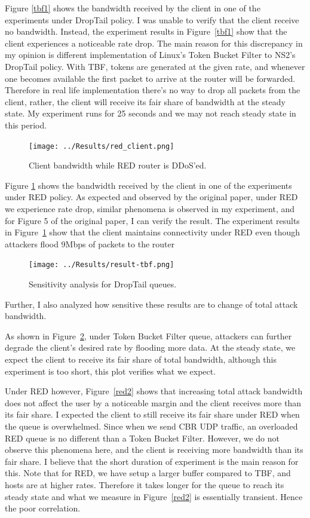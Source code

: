 \documentclass[12pt,twocolumn]{article}
\begin{document}
Figure \ref{tbf1} shows the bandwidth received by the client in one of the experiments under DropTail policy.
I was unable to verify that the client receive no bandwidth.
Instead, the experiment results in Figure~\ref{tbf1} show that the client experiences a noticeable rate drop.
The main reason for this discrepancy in my opinion is different implementation of Linux's Token Bucket Filter to NS2's DropTail policy. With TBF, tokens are generated at the given rate, and whenever one becomes available the first packet to arrive at the router will be forwarded. Therefore in real life implementation there's no way to drop all packets from the client, rather, the client will receive its fair share of bandwidth at the steady state. My experiment runs for 25 seconds and we may not reach steady state in this period.

\begin{figure}[b!]
    \centering
    \texttt{[image: ../Results/red\_client.png]} \caption{Client bandwidth while RED router is DDoS'ed.} \label{red1}
\end{figure}

Figure \ref{red1} shows the bandwidth received by the client in one of the experiments under RED policy.
As expected and observed by the original paper, under RED we experience rate drop, similar phenomena is observed in my experiment, and for Figure 5 of the original paper, I can verify the result.
The experiment results in Figure~\ref{red1} show that the client maintains connectivity under RED even though attackers flood 9Mbps of packets to the router

\begin{figure}[t!]
    \centering
    \texttt{[image: ../Results/result-tbf.png]} \caption{Sensitivity analysis for DropTail queues.} \label{tbf2}
\end{figure}

Further, I also analyzed how sensitive these results are to change of total attack bandwidth.

As shown in Figure~\ref{tbf2}, under Token Bucket Filter queue, attackers can further degrade the client's desired rate by flooding more data.
At the steady state, we expect the client to receive its fair share of total bandwidth, although this experiment is too short, this plot verifies what we expect.

Under RED however, Figure~\ref{red2} shows that increasing total attack bandwidth does not affect the user by a noticeable margin and the client receives more than its fair share.
I expected the client to still receive its fair share under RED when the queue is overwhelmed.
Since when we send CBR UDP traffic, an overloaded RED queue is no different than a Token Bucket Filter.
However, we do not observe this phenomena here, and the client is receiving more bandwidth than its fair share.
I believe that the short duration of experiment is the main reason for this.
Note that for RED, we have setup a larger buffer compared to TBF, and hosts are at higher rates. Therefore it takes longer for the queue to reach its steady state and what we measure in Figure~\ref{red2} is essentially transient. Hence the poor correlation.
\end{document}
